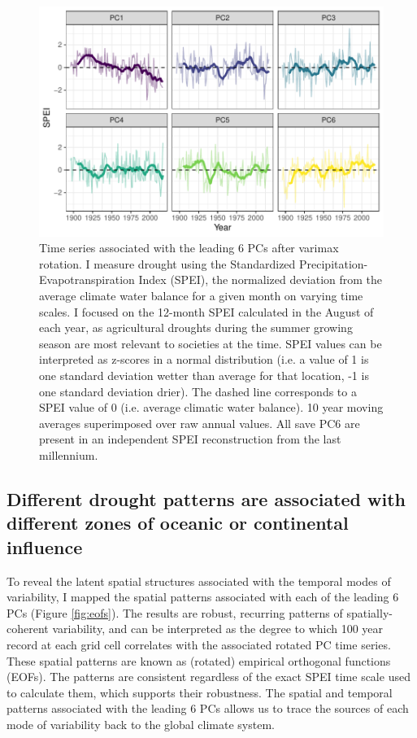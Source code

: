 \documentclass[10pt]{iopart}
\begin{document}
\begin{figure}[!ht]
\centering
\includegraphics[width=.7\linewidth]{figures/pc_obs.pdf}
\caption{Time series associated with the leading 6 PCs after varimax rotation. I measure drought using the Standardized Precipitation-Evapotranspiration Index (SPEI), the normalized deviation from the average climate water balance for a given month on varying time scales. I focused on the 12-month SPEI calculated in the August of each year, as agricultural droughts during the summer growing season are most relevant to societies at the time. SPEI values can be interpreted as z-scores in a normal distribution (i.e. a value of 1 is one standard deviation wetter than average for that location, -1 is one standard deviation drier). The dashed line corresponds to a SPEI value of 0 (i.e. average climatic water balance). 10 year moving averages superimposed over raw annual values. All save PC6 are present in an independent SPEI reconstruction from the last millennium.}
\label{fig:pc-obs}
\end{figure}

\subsection*{Different drought patterns are associated with different zones of oceanic or continental influence}

To reveal the latent spatial structures associated with the temporal modes of variability, I mapped the spatial patterns associated with each of the leading 6 PCs (Figure \ref{fig:eofs}). The results are robust, recurring patterns of spatially-coherent variability, and can be interpreted as the degree to which 100 year record at each grid cell correlates with the associated rotated PC time series. These spatial patterns are known as (rotated) empirical orthogonal functions (EOFs). The patterns are consistent regardless of the exact SPEI time scale used to calculate them, which supports their robustness. The spatial and temporal patterns associated with the leading 6 PCs allows us to trace the sources of each mode of variability back to the global climate system.
\end{document}
